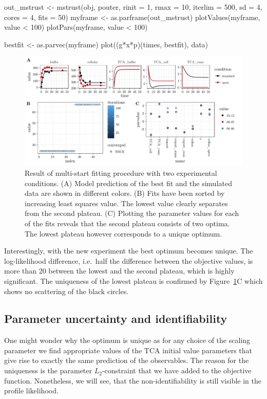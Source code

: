 \documentclass[article]{jss}
\begin{document}
\begin{CodeChunk}
\begin{CodeInput}
out_mstrust <- mstrust(obj, pouter, rinit = 1, rmax = 10, iterlim = 500,
		       sd = 4, cores = 4, fits = 50)
myframe <- as.parframe(out_mstrust)
plotValues(myframe, value < 100)
plotPars(myframe, value < 100)

bestfit <- as.parvec(myframe)
plot((g*x*p)(times, bestfit), data)
\end{CodeInput}
\end{CodeChunk}
\begin{figure}[ht]
	\centering
	\includegraphics[width = \textwidth]{images/figure6}
	\caption{Result of multi-start fitting procedure with two experimental conditions. (A) Model prediction of the best fit and the simulated data are shown in different colors. (B) Fits have been sorted by increasing least squares value. The lowest value clearly separates from the second plateau. (C) Plotting the parameter values for each of the fits reveals that the second plateau consists of two optima. The lowest plateau however corresponds to a unique optimum.}
	\label{fig:twoconditions}
\end{figure}

Interestingly, with the new experiment the best optimum becomes unique. The log-likelihood difference, i.e.~half the difference between the objective values, is more than 20 between the lowest and the second plateau, which is highly significant. The uniqueness of the lowest plateau is confirmed by Figure~\ref{fig:twoconditions}C which shows no scattering of the black circles.

\subsection{Parameter uncertainty and identifiability}

One might wonder why the optimum is unique as for any choice of the scaling parameter  we find appropriate values of the TCA initial value parameters that give rise to exactly the same prediction of the observables. The reason for the uniqueness is the parameter $L_2$-constraint that we have added to the objective function. Nonetheless, we will see, that the non-identifiability is still visible in the profile likelihood.
\end{document}
